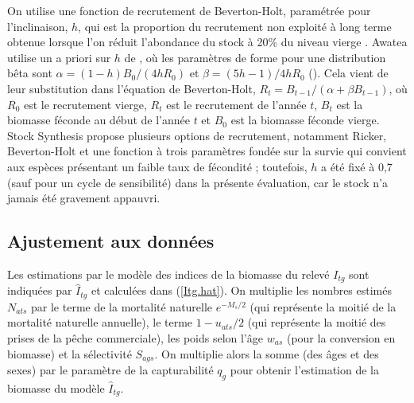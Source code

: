 \documentclass[11pt]{book}
\newcommand{\comment}[1]{}                    %
\newcommand{\pc}{\%}
\newcommand{\eref}[1]{(\ref{#1})}
\begin{document}
On utilise une fonction de recrutement de Beverton-Holt, param\'{e}tr\'{e}e pour l'inclinaison, $h$, qui est la proportion du recrutement non exploit\'{e} \`{a} long terme obtenue lorsque l'on r\'{e}duit l'abondance du stock \`{a} 20\pc{} du niveau vierge \citep{Mace-Doonan:1988, Michielsens-McAllister:2004}.
Awatea utilise un a priori sur $h$ de \citet{Forrest-etal:2010}, o\`{u} les param\`{e}tres de forme pour une distribution b\^{e}ta sont $\alpha = (1 - h) B_0 / (4 h R_0)$ et $\beta = (5 h - 1) / 4 h R_0$ (\citealt{Hilborn-etal:2003, Michielsens-McAllister:2004}).
Cela vient de leur substitution dans l'\'{e}quation de Beverton-Holt, $R_t = B_{t-1} / (\alpha + \beta B_{t-1})$, o\`{u} $R_0$ est le recrutement vierge, $R_t$ est le recrutement de l'ann\'{e}e $t$, $B_t$ est la biomasse f\'{e}conde au d\'{e}but de l'ann\'{e}e $t$ et $B_0$ est la biomasse f\'{e}conde vierge.
Stock Synthesis propose plusieurs options de recrutement, notamment Ricker, Beverton-Holt et une fonction \`{a} trois param\`{e}tres fond\'{e}e sur la survie qui convient aux esp\`{e}ces pr\'{e}sentant un faible taux de f\'{e}condit\'{e} \citep{Taylor-etal:2013}; toutefois, $h$ a \'{e}t\'{e} fix\'{e} \`{a} 0,7 (sauf pour un cycle de sensibilit\'{e}) dans la pr\'{e}sente \'{e}valuation, car le stock n'a jamais \'{e}t\'{e} gravement appauvri.

\subsection{Ajustement aux donn\'{e}es}

Les estimations par le mod\`{e}le des indices de la biomasse du relev\'{e} $I_{tg}$ sont indiqu\'{e}es par $\widehat{I}_{tg}$ et calcul\'{e}es dans \eref{Itg.hat}.
On multiplie les nombres estim\'{e}s $N_{ats}$ par le terme de la mortalit\'{e} naturelle $e^{-M_s / 2}$ (qui repr\'{e}sente la moiti\'{e} de la mortalit\'{e} naturelle annuelle), le terme $1 - u_{ats} / 2$ (qui repr\'{e}sente la moiti\'{e} des prises de la p\^{e}che commerciale), les poids selon l'\^{a}ge $w_{as}$ (pour la conversion en biomasse) et la s\'{e}lectivit\'{e} $S_{ags}$.
On multiplie alors la somme (des \^{a}ges et des sexes) par le param\`{e}tre de la capturabilit\'{e} $q_g$ pour obtenir l'estimation de la biomasse du mod\`{e}le $\widehat{I}_{tg}$.
\comment{
}
\end{document}
